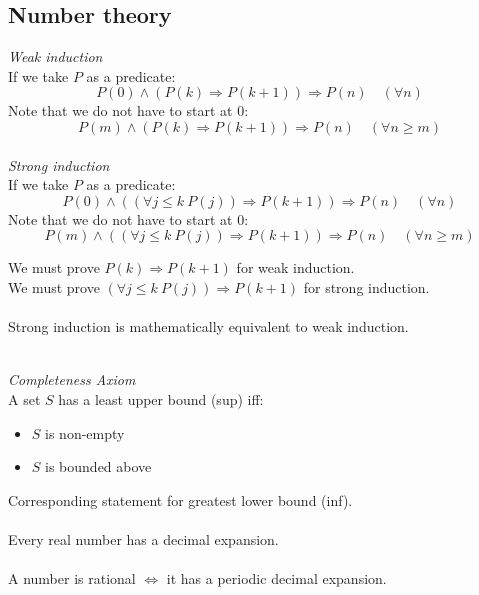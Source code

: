 \documentclass{article}
\begin{document}
\subsection{Number theory}
\textit{Weak induction}
\\
If we take $ P $ as a predicate:
\begin{equation}
P(0) \land (P(k) \Rightarrow P(k+1)) \Rightarrow P(n) \quad (\forall n)
\end{equation}
Note that we do not have to start at 0:
\begin{equation}
P(m) \land (P(k) \Rightarrow P(k+1)) \Rightarrow P(n) \quad (\forall n \geq m)
\end{equation}
\\
\textit{Strong induction}
\\
If we take $ P $ as a predicate:
\begin{equation}
P(0) \land ((\forall j \leq k \ P(j)) \Rightarrow P(k+1)) \Rightarrow P(n) \quad (\forall n)
\end{equation}
Note that we do not have to start at 0:
\begin{equation}
P(m) \land ((\forall j \leq k \ P(j)) \Rightarrow P(k+1)) \Rightarrow P(n) \quad (\forall n \geq m)
\end{equation}
\begin{tcolorbox}
We must prove $ P(k) \Rightarrow P(k+1) $ for weak induction.
\\
We must prove $ (\forall j \leq k \ P(j)) \Rightarrow P(k+1) $ for strong induction.
\\\\
Strong induction is mathematically equivalent to weak induction.
\end{tcolorbox}
\noindent
\\
\textit{Completeness Axiom}
\\
A set $ S $ has a least upper bound (sup) iff:
\begin{itemize}
\item $ S $ is non-empty
\item $ S $ is bounded above
\end{itemize}
Corresponding statement for greatest lower bound (inf).
\\\\
Every real number has a decimal expansion.
\\\\
A number is rational $ \Leftrightarrow $ it has a periodic decimal expansion.
\\\\
\end{document}
